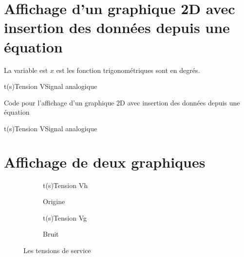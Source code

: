 \section{Affichage d'un graphique 2D avec insertion des données depuis une équation}

La variable est $x$ est les fonction trigonométriques sont en degrés.\\

\begin{graphicFigure}{0.4}{0.4}{0}{3}{-1}{5}{t(s)}{Tension V}{Signal analogique}

  
\end{graphicFigure}
\setDefaultFillColor

\begin{Latex}{Code pour l'affichage d'un graphique 2D avec insertion des données depuis une équation}
  \begin{graphicFigure}{0.4}{0.4}{0}{3}{-1}{5}{t(s)}{Tension V}{Signal analogique}
  \end{graphicFigure}
\end{Latex}

\newpage
\section{Affichage de deux graphiques}

  \begin{figure}[h!]  
    \centering 
      \begin{subfigure}[b]{0.4\linewidth}
        \begin{graphic}{0.8}{1}{0}{1.2}{-1}{5}{t(s)}{Tension V}{h}
          \end{graphic}%
        \caption{Origine} 
      \end{subfigure}
    \begin{subfigure}[b]{0.4\linewidth}
      \begin{graphic}{0.8}{1}{0}{4}{-0.3}{0.3}{t(s)}{Tension V}{g}
        \end{graphic}%
    \caption{Bruit}
    \end{subfigure}
    \caption{Les tensions de service}
    \end{figure}  


